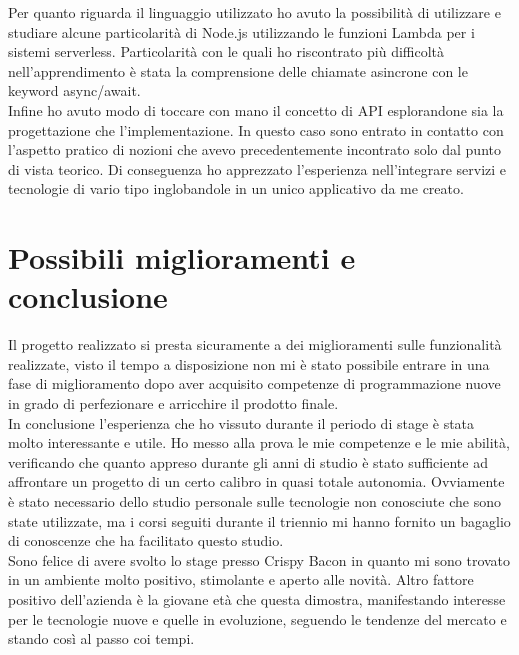 \noindent
Per quanto riguarda il linguaggio utilizzato ho avuto la possibilità di utilizzare e studiare alcune particolarità di Node.js utilizzando le funzioni Lambda per i sistemi serverless. Particolarità con le quali ho riscontrato più difficoltà nell'apprendimento è stata la comprensione delle chiamate asincrone con le keyword async/await.\\
Infine ho avuto modo di toccare con mano il concetto di API esplorandone sia la progettazione che l'implementazione. In questo caso sono entrato in contatto con l'aspetto pratico di nozioni che avevo precedentemente incontrato solo dal punto di vista teorico. Di conseguenza ho apprezzato l'esperienza nell'integrare servizi e tecnologie di vario tipo inglobandole in un unico applicativo da me creato.

\section{Possibili miglioramenti e conclusione}
Il progetto realizzato si presta sicuramente a dei miglioramenti sulle funzionalità realizzate, visto il tempo a disposizione non mi è stato possibile entrare in una fase di miglioramento dopo aver acquisito competenze di programmazione nuove in grado di perfezionare e arricchire il prodotto finale.\\
In conclusione l'esperienza che ho vissuto durante il periodo di stage è stata molto interessante e utile. Ho messo alla prova le mie competenze e le mie abilità, verificando che quanto appreso durante gli anni di studio è stato sufficiente ad affrontare un progetto di un certo calibro in quasi totale autonomia. Ovviamente è stato necessario dello studio personale sulle tecnologie non conosciute che sono state utilizzate, ma i corsi seguiti durante il triennio mi hanno fornito un bagaglio di conoscenze che ha facilitato questo studio.\\
Sono felice di avere svolto lo stage presso Crispy Bacon in quanto mi sono trovato in un ambiente molto positivo, stimolante e aperto alle novità. Altro fattore positivo dell'azienda è la giovane età che questa dimostra, manifestando interesse per le tecnologie nuove e quelle in evoluzione, seguendo le tendenze del mercato e stando così al passo coi tempi.